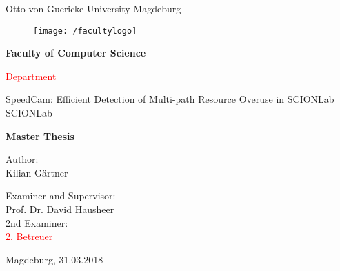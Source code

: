 \documentclass[thesis.tex]{subfiles}
\begin{document}
\thispagestyle {empty}

\begin{center}
\begin{Large}
Otto-von-Guericke-University Magdeburg\\

\begin{figure}
	\centering
	\texttt{[image: /facultylogo]}
	\label{fig:logoinffak}
\end{figure}

\vspace{3mm}

\textbf{Faculty of Computer Science}\\
\end{Large}

\vspace{3mm}

\textcolor{red}{Department}\\

\vspace{1cm}
\begin{Huge}
SpeedCam: Efficient Detection of Multi-path Resource Overuse in SCIONLab SCIONLab\\
\end{Huge}
\vspace{15mm}
{\Huge \textbf{Master Thesis}}\\
\vspace{15mm}

Author:\\
\vspace{4mm}
{\huge Kilian G\"{a}rtner}\\

\vspace{16mm}

Examiner and Supervisor:\\
\vspace{2mm}
{\Large Prof. Dr. David Hausheer}\\
\vspace{4mm}
2nd Examiner:\\
\vspace{2mm}
{\Large \textcolor{red}{2. Betreuer}}\\
\vspace{10mm}
\vspace{2mm}


\vspace{25mm}

{\large Magdeburg, 31.03.2018}\\

\vspace{40mm}

\end{center}
\clearpage
\end{document}
